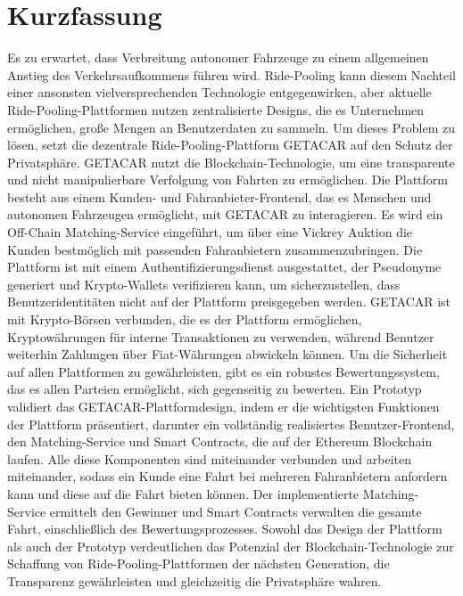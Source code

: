 \documentclass[
  a4paper,  %
  twoside,  %
  bibliography=totoc,
  headsepline,
  cleardoublepage=empty,
  parskip=half,
  draft=false
]{scrbook}
\begin{document}
  \section*{Kurzfassung}
Es zu erwartet, dass Verbreitung autonomer Fahrzeuge zu einem allgemeinen Anstieg des Verkehrsaufkommens führen wird. Ride-Pooling kann diesem Nachteil einer ansonsten vielversprechenden Technologie entgegenwirken, aber aktuelle Ride-Pooling-Plattformen nutzen zentralisierte Designs, die es Unternehmen ermöglichen, große Mengen an Benutzerdaten zu sammeln. Um dieses Problem zu lösen, setzt die dezentrale Ride-Pooling-Plattform GETACAR auf den Schutz der Privatsphäre. GETACAR nutzt die Blockchain-Technologie, um eine transparente und nicht manipulierbare Verfolgung von Fahrten zu ermöglichen. Die Plattform besteht aus einem Kunden- und Fahranbieter-Frontend, das es Menschen und autonomen Fahrzeugen ermöglicht, mit GETACAR zu interagieren. Es wird ein Off-Chain Matching-Service eingeführt, um über eine Vickrey Auktion die Kunden bestmöglich mit passenden Fahranbietern zusammenzubringen. Die Plattform ist mit einem Authentifizierungsdienst ausgestattet, der Pseudonyme generiert und Krypto-Wallets verifizieren kann, um sicherzustellen, dass Benutzeridentitäten nicht auf der Plattform preisgegeben werden. GETACAR ist mit Krypto-Börsen verbunden, die es der Plattform ermöglichen, Kryptowährungen für interne Transaktionen zu verwenden, während Benutzer weiterhin Zahlungen über Fiat-Währungen abwickeln können. Um die Sicherheit auf allen Plattformen zu gewährleisten, gibt es ein robustes Bewertungssystem, das es allen Parteien ermöglicht, sich gegenseitig zu bewerten. Ein Prototyp validiert das GETACAR-Plattformdesign, indem er die wichtigsten Funktionen der Plattform präsentiert, darunter ein vollständig realisiertes Benutzer-Frontend, den Matching-Service und Smart Contracts, die auf der Ethereum Blockchain laufen. Alle diese Komponenten sind miteinander verbunden und arbeiten miteinander, sodass ein Kunde eine Fahrt bei mehreren Fahranbietern anfordern kann und diese auf die Fahrt bieten können. Der implementierte Matching-Service ermittelt den Gewinner und Smart Contracts verwalten die gesamte Fahrt, einschließlich des Bewertungsprozesses. Sowohl das Design der Plattform als auch der Prototyp verdeutlichen das Potenzial der Blockchain-Technologie zur Schaffung von Ride-Pooling-Plattformen der nächsten Generation, die Transparenz gewährleisten und gleichzeitig die Privatsphäre wahren.


\cleardoublepage
\end{document}
